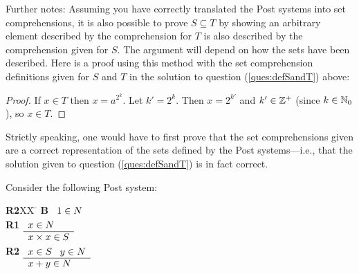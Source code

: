 \documentclass[]{exam}
\begin{document}
\begin{questions}
\begin{parts}
\begin{solution}
Further notes: Assuming you have correctly translated the Post systems into
set comprehensions, it is also possible to prove $S \subseteq T$ by showing
an arbitrary element described by the comprehension for $T$ is also described
by the comprehension given for $S$. The argument will depend on how the sets 
have been described. Here is a proof using this method with the set comprehension 
definitions given for $S$ and 
$T$ in the solution to question (\ref{ques:defSandT}) above:
\begin{proof}
If $x \in T$ then $x = a^{2^k}$. Let $k' = 2^k$. Then $x = 2^{k'}$ and 
$k' \in \mathbb{Z}^+$ (since $k \in \mathbb{N}_0$), so $x \in T$.
\end{proof}
Strictly speaking, one would have to first prove that the set comprehensions 
given are a correct representation of the sets defined by the Post
systems---i.e., that the solution given to question (\ref{ques:defSandT}) 
is in fact correct.  
\end{solution}
\end{parts}

\question Consider the following Post system:

\begin{tabbing}
{\bf R2}XX \=  \kill
{\bf B} \>
        \(\begin{array}[t]{l}
        1 \in N
        \end{array}\) \\[2ex]
{\bf R1} \>
        \(\begin{array}[t]{l}
        x \in N \\
        \hline
        x\times x \in S
        \end{array}\)\\[2ex]
{\bf R2} \>
        \(\begin{array}[t]{l}
        x \in S \;\;\; y \in N \\
        \hline
        x+y \in N
        \end{array}\)
\end{tabbing}
\end{questions}
\end{document}
